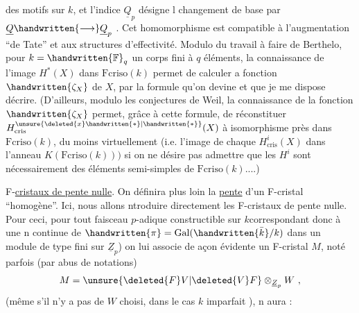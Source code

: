 
des motifs  sur $k$, et l'indice $\underline{Q}_p$ désigne l  changement de base par $\underline{Q}\handwritten{\longrightarrow}\underline{Q}_p$ . Cet homomorphisme est compatible à l'augmentation ``de Tate'' et aux structures d'effectivité. Modulo du travail à faire de Berthelo, pour $k=\handwritten{\mathbb{F}}_q$ un corps fini à $q$ éléments, la connaissance de l'image  $H^*(X)$ dans $\mathrm{Fcriso}(k)$ permet de calculer a fonction $\handwritten{\zeta_X}$ de $X$, par la formule qu'on devine et que je me dispose décrire. (D'ailleurs, modulo les conjectures de Weil, la connaissance de la fonction $\handwritten{\zeta_X}$ permet, grâce à cette formule, de réconstituer $H^{\unsure{\deleted{x}\handwritten{*}|\handwritten{*}}}_{\mathrm{cris}}(X)$ à isomorphisme près dans $\mathrm{Fcriso}(k)$, du moins virtuellement (i.e. l'image de chaque $H^i_{\mathrm{cris}}(X)$ dans l'anneau $K(\mathrm{Fcriso}(k)))$ si on ne désire pas admettre que  les $H^i$ sont nécessairement des éléments semi-simples de $\mathrm{Fcriso}(k)$....)

 F-\uline{cristaux de  pente nulle}. On définira plus loin la \uline{pente} d'un F-cristal ``homogène''. Ici, nous allons ntroduire directement les F-cristaux de pente nulle. Pour ceci, pour tout faisceau $p$-adique constructible  sur $k$\handwritten{(}correspondant donc à une n continue de $\handwritten{\pi}=\operatorname{Gal}(\handwritten{\bar{k}}/k)$ dans un module de type fini sur $\underline{Z}_p$) on lui associe de açon évidente un F-cristal $M$, noté parfois (par abus de notations)
\[
M=\unsure{\deleted{F}V|\deleted{V}F}\otimes_{\underline{Z}_p}W\ ,
\]
(même s'il n'y a pas de $W$ choisi, dans le cas $k$ imparfait \handwritten{!} ), n aura :

